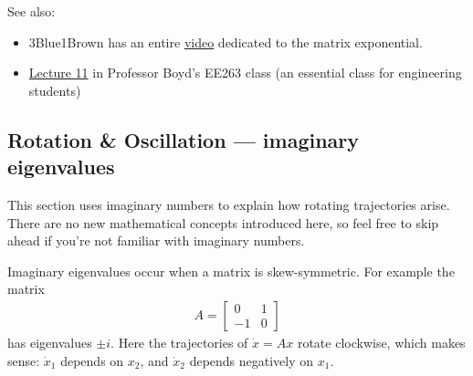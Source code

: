 \documentclass[11pt, oneside]{article}   	%
\begin{document}
See also:
\begin{itemize}
\item 3Blue1Brown has an entire \href{https://youtu.be/O85OWBJ2ayo}{video} dedicated to the matrix exponential.
\item \href{https://www.youtube.com/watch?v=5ePa2UOkEV0&list=PL06960BA52D0DB32B}{Lecture 11} in Professor Boyd's EE263 class
(an essential class for engineering students)
\end{itemize}

\subsection*{Rotation \& Oscillation --- imaginary eigenvalues}
This section uses imaginary numbers to explain how rotating trajectories arise.
There are no new mathematical concepts introduced here,
so feel free to skip ahead if you're not familiar with imaginary numbers.

Imaginary eigenvalues occur when a matrix is skew-symmetric.
For example the matrix
\begin{align} \nonumber
  A =
  \begin{bmatrix}
    0 & 1 \\
    -1 & 0
  \end{bmatrix}
\end{align}
has eigenvalues $\pm i$.
Here the trajectories of $\dot{x} = Ax$ rotate clockwise, which makes sense:
$\dot{x}_1$ depends on $x_2$, and $\dot{x}_2$ depends negatively on $x_1$.
\end{document}
